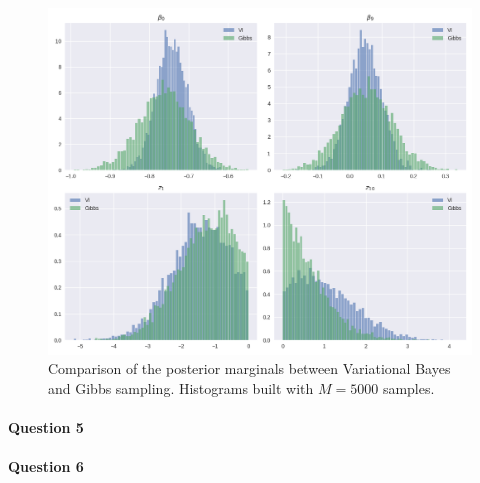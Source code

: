 \documentclass[11pt]{article}
\begin{document}
\begin{figure}[h]
	\includegraphics[width=\linewidth]{images/posterior_VI_Gibbs_comparison_1.png}
	\caption{Comparison of the posterior marginals between Variational Bayes and Gibbs sampling. Histograms built with $M=5000$ samples.}\label{fig:VBGibbsPosteriorComparison}
\end{figure}

\paragraph{Question 5}


\paragraph{Question 6}
\end{document}
